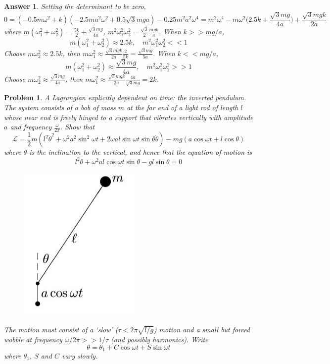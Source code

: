 \documentclass[a4paper]{article}
\newtheorem{ans}{Answer}[section]
\theoremstyle{new}
\newtheorem{qns}{Problem}[section]
\begin{document}
\begin{ans}
Setting the determinant to be zero, 
$$0=(-0.5m\omega^2+k)(-2.5ma^2\omega^2+0.5\sqrt{3}mga)-0.25m^2a^2\omega^4=m^2\omega^4-m\omega^2\bigg(2.5k+\frac{\sqrt{3}mg}{4a}\bigg)+\frac{\sqrt{3}mgk}{2a}$$
where $m(\omega_1^2+\omega_2^2)=\frac{5k}{2}+\frac{\sqrt{3}mg}{4a}$, $m^2\omega_1^2\omega_2^2=\frac{\sqrt{3}}{2}\frac{mgk}{a}$. When $k>>mg/a$,
$$m(\omega_1^2+\omega_2^2)\approx2.5k,\quad m^2\omega_1^2\omega_2^2<<1$$
Choose $m\omega_2^2\approx2.5k$, then $m\omega_1^2\approx\frac{\sqrt{3}mgk}{2a}\frac{2}{5k}=\frac{\sqrt{3}mg}{5a}$. When $k<<mg/a$,
$$m(\omega_1^2+\omega_2^2)\approx\frac{\sqrt{3}mg}{4a},\quad m^2\omega_1^2\omega_2^2>>1$$
Choose $m\omega_2^2\approx\frac{\sqrt{3}mg}{4a}$, then $m\omega_1^2\approx\frac{\sqrt{3}mgk}{2a}\frac{4a}{\sqrt{3}mg}=2k$. 
\end{ans}
\begin{qns}
A Lagrangian explicitly dependent on time: the inverted pendulum. The system consists of a bob of mass $m$ at the far end of a light rod of length $l$ whose near end is freely hinged to a support that vibrates vertically with amplitude $a$ and frequency $\frac{\omega}{2\pi}$. Show that
$$\mathcal{L}=\frac{1}{2}m(l^2\dot{\theta}^2+\omega^2a^2\sin^2\omega t+2\omega al\sin\omega t\sin\theta\dot{\theta})-mg(a\cos\omega t+l\cos\theta)$$
where $\theta$ is the inclination to the vertical, and hence that the equation of motion is
$$l^2\ddot{\theta}+\omega^2al\cos\omega t\sin\theta-gl\sin\theta=0$$
\begin{figure}[H]
    \centering
    \includegraphics[scale=0.5]{TP1_Q2_L.JPG}
\end{figure}
The motion must consist of a `slow' ($\tau<2\pi\sqrt{l/g}$) motion and a small but forced wobble at frequency $\omega/2\pi>>1/\tau$ (and possibly harmonics). Write
$$\theta=\theta_1+C\cos\omega t+S\sin\omega t$$
where $\theta_1$, $S$ and $C$ vary slowly.\\[5pt]

\end{qns}
\end{document}
